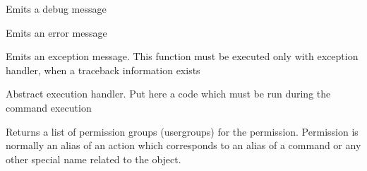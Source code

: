 \documentclass[letterpaper,10pt,english]{sphinxmanual}
\begin{document}
\begin{fulllineitems}
\begin{fulllineitems}
\end{fulllineitems}


\begin{fulllineitems}
\label{command:pyfrid.core.command.BaseCommand.debug}
Emits a debug message

\end{fulllineitems}


\begin{fulllineitems}
\label{command:pyfrid.core.command.BaseCommand.error}
Emits an error message

\end{fulllineitems}


\begin{fulllineitems}
\label{command:pyfrid.core.command.BaseCommand.exception}
Emits an exception message.
This function must be executed only with exception handler, when a traceback information exists

\end{fulllineitems}


\begin{fulllineitems}
\label{command:pyfrid.core.command.BaseCommand.execute}
Abstract execution handler. Put here a code which must be run during the command execution

\end{fulllineitems}


\begin{fulllineitems}
\label{command:pyfrid.core.command.BaseCommand.get_permission_groups}
Returns a list of permission groups (usergroups) for the permission. Permission is normally
an alias of an action which corresponds to an alias of a command or any other special name related to the object.


\end{fulllineitems}
\end{fulllineitems}
\end{document}
